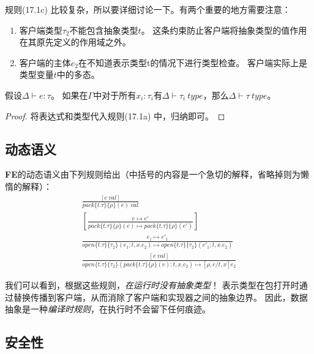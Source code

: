 规则(17.1c)%
比较复杂，所以要详细讨论一下。有两个重要的地方需要注意：

\begin{enumerate}
\item 客户端类型$\tau_{2}$不能包含抽象类型$t$。
这条约束防止客户端将抽象类型的值作用在其原先定义的作用域之外。
\item 客户端的主体$e_{2}$在不知道表示类型t的情况下进行类型检查。
客户端实际上是类型变量$t$中的多态。
\end{enumerate}

\begin{lemma}[规律性]
假设$\Delta \vdash e:\tau$。
如果在$\Gamma$中对于所有$x_{i}:\tau_{i}$有$\Delta \vdash \tau_{i}\ type$，那么$\Delta \vdash \tau\ type$。
\end{lemma}

\begin{proof}
将表达式和类型代入规则(17.1a)%
中，归纳即可。
\end{proof}

\subsection{动态语义}

\textbf{FE}的动态语义由下列规则给出（中括号的内容是一个急切的解释，省略掉则为懒惰的解释）：
\begin{subequations}
	\begin{gather}
		\frac{[e\ val]}{pack\{t.\tau\}\{\rho\}(e)\ val}\\
		\left[\frac{e\longmapsto e'}{pack\{t.\tau\}\{\rho\}(e)\longmapsto pack\{t.\tau\}\{\rho\}(e')}\right]\\
		\frac{e_{1}\longmapsto e'_{1}}
			{open\{t.\tau\}\{\tau_2\}(e_1;t,x.e_2)\longmapsto open\{t.\tau\}\{\tau_2\}(e'_{1};t,x.e_2)}\\
		\frac{[e\ val]}
			{open\{t.\tau\}\{\tau_2\}(pack\{t.\tau\}\{\rho\}(e);t,x.e_2) \longmapsto [\rho,e/t,x]e_2}
	\end{gather}
\end{subequations}

我们可以看到，根据这些规则，\textit{在运行时没有抽象类型}！
表示类型在包打开时通过替换传播到客户端，从而消除了客户端和实现器之间的抽象边界。
因此，数据抽象是一种\textit{编译时规则}，在执行时不会留下任何痕迹。

\subsection{安全性}

